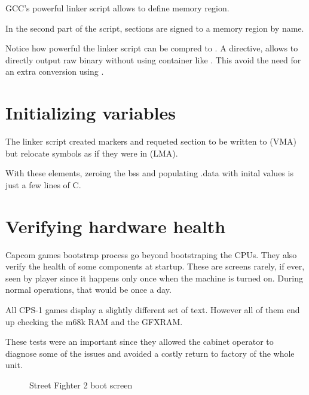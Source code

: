  GCC's powerful linker script allows to define memory region.





In the second part of the script, sections are signed to a memory region by name.



\begin{trivia}
Notice how powerful the linker script can be compred to . A directive,  allows to directly output raw binary without using container like . This avoid the need for an extra conversion using .
\end{trivia}

\section{Initializing variables}
The linker script created markers and requeted section  to be written to  (VMA) but relocate symbols as if they were in  (LMA).

With these elements, zeroing the bss and populating .data with inital values is just a few lines of C.



\section{Verifying hardware health}
Capcom games bootstrap process go beyond bootstraping the CPUs. They also verify the health of some components at startup. These are screens rarely, if ever, seen by player since it happens only once when the machine is turned on. During normal operations, that would be once a day.

All CPS-1 games display a slightly different set of text. However all of them end up checking the m68k RAM and the GFXRAM. 

These tests were an important since they allowed the cabinet operator to diagnose some of the issues and avoided a costly return to factory of the whole unit.



\vfill
\begin{figure}[H]
\caption*{Street Fighter 2 boot screen}
\end{figure}


